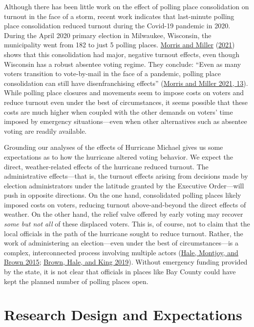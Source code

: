 \documentclass[
  12pt,
]{article}
\begin{document}
Although there has been little work on the effect of polling place consolidation on turnout in the face of a storm, recent work indicates that last-minute polling place consolidation reduced turnout during the Covid-19 pandemic in 2020. During the April 2020 primary election in Milwaukee, Wisconsin, the municipality went from 182 to just 5 polling places. \protect\hyperlink{ref-Morris2021}{Morris and Miller} (\protect\hyperlink{ref-Morris2021}{2021}) shows that this consolidation had major, negative turnout effects, even though Wisconsin has a robust absentee voting regime. They conclude: ``Even as many voters transition to vote-by-mail in the face of a pandemic, polling place consolidation can still have disenfranchising effects'' (\protect\hyperlink{ref-Morris2021}{Morris and Miller 2021, 13}). While polling place closures and movements seem to impose costs on voters and reduce turnout even under the best of circumstances, it seems possible that these costs are much higher when coupled with the other demands on voters' time imposed by emergency situations---even when other alternatives such as absentee voting are readily available.

Grounding our analyses of the effects of Hurricane Michael gives us some expectations as to how the hurricane altered voting behavior. We expect the direct, weather-related effects of the hurricane reduced turnout. The administrative effects---that is, the turnout effects arising from decisions made by election administrators under the latitude granted by the Executive Order---will push in opposite directions. On the one hand, consolidated polling places likely imposed costs on voters, reducing turnout above-and-beyond the direct effects of weather. On the other hand, the relief valve offered by early voting may recover \emph{some but not all} of these displaced voters. This is, of course, not to claim that the local officials in the path of the hurricane sought to reduce turnout. Rather, the work of administering an election---even under the best of circumstances---is a complex, interconnected process involving multiple actors (\protect\hyperlink{ref-Hale2015}{Hale, Montjoy, and Brown 2015}; \protect\hyperlink{ref-Brown2019}{Brown, Hale, and King 2019}). Without emergency funding provided by the state, it is not clear that officials in places like Bay County could have kept the planned number of polling places open.

\hypertarget{research-design-and-expectations}{%
\section*{Research Design and Expectations}\label{research-design-and-expectations}}
\end{document}
